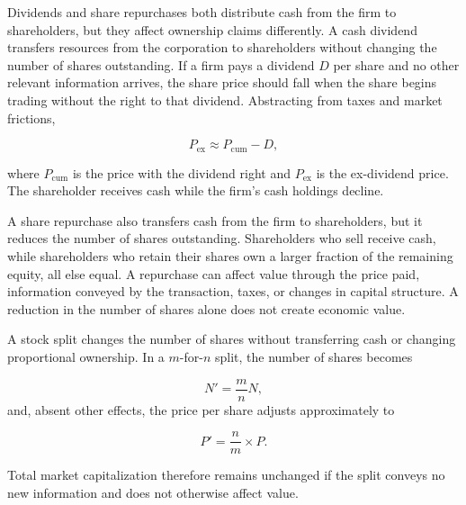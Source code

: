Dividends and share repurchases both distribute cash from the firm to shareholders, but they affect ownership claims differently. A cash dividend transfers resources from the corporation to shareholders without changing the number of shares outstanding. If a firm pays a dividend \(D\) per share and no other relevant information arrives, the share price should fall when the share begins trading without the right to that dividend. Abstracting from taxes and market frictions,

\begin{equation}
P_{\mathrm{ex}}
\approx
P_{\mathrm{cum}}-D,
\label{eq:ch9-ex-dividend-price}
\end{equation}

where \(P_{\mathrm{cum}}\) is the price with the dividend right and \(P_{\mathrm{ex}}\) is the ex-dividend price. The shareholder receives cash while the firm's cash holdings decline.

A share repurchase also transfers cash from the firm to shareholders, but it reduces the number of shares outstanding. Shareholders who sell receive cash, while shareholders who retain their shares own a larger fraction of the remaining equity, all else equal. A repurchase can affect value through the price paid, information conveyed by the transaction, taxes, or changes in capital structure. A reduction in the number of shares alone does not create economic value.

A stock split changes the number of shares without transferring cash or changing proportional ownership. In a \(m\)-for-\(n\) split, the number of shares becomes

\begin{equation}
N'=\frac{m}{n}N,
\label{eq:ch9-stock-split-shares}
\end{equation}
and, absent other effects, the price per share adjusts approximately to

\begin{equation}
P'=\frac{n}{m}\times P.
\label{eq:ch9-stock-split-price}
\end{equation}

Total market capitalization therefore remains unchanged if the split conveys no new information and does not otherwise affect value.

